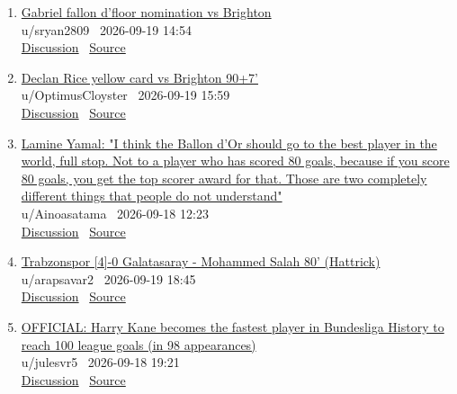 \documentclass[11pt,a4paper]{article}
\begin{document}
\begin{enumerate}
  \item \href{https://www.reddit.com/r/soccer/comments/1wkob9w/gabriel_fallon_dfloor_nomination_vs_brighton/}{Gabriel fallon d'floor nomination vs Brighton}\\ {\small u/sryan2809 \textbullet\ 2026-09-19 14:54}\\ {\small \href{https://www.reddit.com/r/soccer/comments/1wkob9w/gabriel_fallon_dfloor_nomination_vs_brighton/}{Discussion} \textbullet\ \href{https://v.redd.it/3fhwi8ciqhqh1}{Source}}
  \item \href{https://www.reddit.com/r/soccer/comments/1wkpvt1/declan_rice_yellow_card_vs_brighton_907/}{Declan Rice yellow card vs Brighton 90+7'}\\ {\small u/OptimusCloyster \textbullet\ 2026-09-19 15:59}\\ {\small \href{https://www.reddit.com/r/soccer/comments/1wkpvt1/declan_rice_yellow_card_vs_brighton_907/}{Discussion} \textbullet\ \href{https://v.redd.it/hgad6ra22iqh1}{Source}}
  \item \href{https://www.reddit.com/r/soccer/comments/1wjoqdu/lamine_yamal_i_think_the_ballon_dor_should_go_to/}{Lamine Yamal: "I think the Ballon d'Or should go to the best player in the world, full stop. Not to a player who has scored 80 goals, because if you score 80 goals, you get the top scorer award for that. Those are two completely different things that people do not understand"}\\ {\small u/Ainoasatama \textbullet\ 2026-09-18 12:23}\\ {\small \href{https://www.reddit.com/r/soccer/comments/1wjoqdu/lamine_yamal_i_think_the_ballon_dor_should_go_to/}{Discussion} \textbullet\ \href{https://www.goal.com/en/news/don-t-people-understand-lamine-yamal-takes-a-swipe-at-harry-kane-in-the-ballon-d-or-debate/bltdadef4f01b2a6b23}{Source}}
  \item \href{https://www.reddit.com/r/soccer/comments/1wku3cz/trabzonspor_40_galatasaray_mohammed_salah_80/}{Trabzonspor [4]-0 Galatasaray - Mohammed Salah 80' (Hattrick)}\\ {\small u/arapsavar2 \textbullet\ 2026-09-19 18:45}\\ {\small \href{https://www.reddit.com/r/soccer/comments/1wku3cz/trabzonspor_40_galatasaray_mohammed_salah_80/}{Discussion} \textbullet\ \href{https://v.redd.it/1p78bnbsviqh1}{Source}}
  \item \href{https://www.reddit.com/r/soccer/comments/1wjzpld/official_harry_kane_becomes_the_fastest_player_in/}{OFFICIAL: Harry Kane becomes the fastest player in Bundesliga History to reach 100 league goals (in 98 appearances)}\\ {\small u/julesvr5 \textbullet\ 2026-09-18 19:21}\\ {\small \href{https://www.reddit.com/r/soccer/comments/1wjzpld/official_harry_kane_becomes_the_fastest_player_in/}{Discussion} \textbullet\ \href{https://i.redd.it/iw3knc7cxbqh1.jpeg}{Source}}

\end{enumerate}
\end{document}
